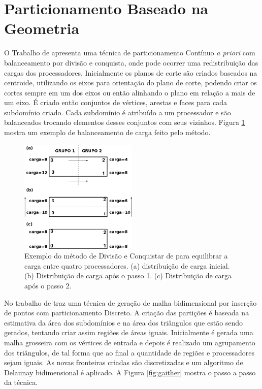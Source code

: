  
 
 
 
 
 
 
 
 
 
 


\section{Particionamento Baseado na Geometria}
\label{sec:decomposição_geometria}

O Trabalho de \cite{bib:VIDWANS94} apresenta uma técnica de particionamento Contínuo \textit{a priori} com balanceamento por divisão e conquista, onde pode ocorrer uma redistribuição das cargas dos processadores. Inicialmente os planos de corte são criados baseados na centroide, utilizando os eixos para orientação do plano de corte, podendo criar os cortes sempre em um dos eixos ou então alinhando o plano em relação a mais de um eixo. É criado então conjuntos de vértices, arestas e faces para cada subdomínio criado. Cada subdomínio é atribuído a um processador e são balanceados trocando elementos desses conjuntos com seus vizinhos. Figura \ref{fig:vidwans} mostra um exemplo de balanceamento de carga feito pelo método.


 \begin{figure}[htbp]
     \centering
     \includegraphics[width=0.5\textwidth]{fig/vidwans.png}
     \caption{Exemplo do método de Divisão e Conquistar de \cite{bib:VIDWANS94} para equilibrar a carga entre quatro processadores. (a) distribuição de carga inicial. (b) Distribuição de carga após o passo 1. (c) Distribuição de carga após o passo 2.}
     \label{fig:vidwans}
 \end{figure} 

 
No trabalho de \cite{bib:GAITHER96} traz uma técnica de geração de malha bidimensional por inserção de pontos com particionamento Discreto. A criação das partições é baseada na estimativa da área dos subdomínios e na área dos triângulos que estão sendo gerados, tentando criar assim regiões de áreas iguais. Inicialmente é gerada uma malha grosseira com os vértices de entrada e depois é realizado um agrupamento dos triângulos, de tal forma que ao final a quantidade de regiões e processadores sejam iguais. As novas fronteiras criadas são discretizadas e um algoritmo de Delaunay bidimensional é aplicado. A Figura \ref{fig:gaither} mostra o passo a passo da técnica.

